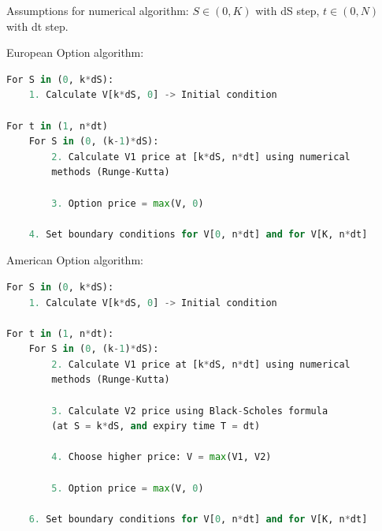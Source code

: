 \documentclass[10pt,a4paper]{article}
\begin{document}
Assumptions for numerical algorithm: $S \in (0, K)$ with dS step, $t \in (0, N)$ with dt step.

European Option algorithm:
\begin{lstlisting}[language=Python]
For S in (0, k*dS):
	1. Calculate V[k*dS, 0] -> Initial condition
	
For t in (1, n*dt)
	For S in (0, (k-1)*dS):
		2. Calculate V1 price at [k*dS, n*dt] using numerical 
		methods (Runge-Kutta)
	
		3. Option price = max(V, 0)
	
	4. Set boundary conditions for V[0, n*dt] and for V[K, n*dt] 
\end{lstlisting}

American Option algorithm:
\begin{lstlisting}[language=Python]
For S in (0, k*dS):
	1. Calculate V[k*dS, 0] -> Initial condition
		
For t in (1, n*dt):
	For S in (0, (k-1)*dS):
		2. Calculate V1 price at [k*dS, n*dt] using numerical 
		methods (Runge-Kutta)
		
		3. Calculate V2 price using Black-Scholes formula 
		(at S = k*dS, and expiry time T = dt)
		
		4. Choose higher price: V = max(V1, V2)
		
		5. Option price = max(V, 0)

	6. Set boundary conditions for V[0, n*dt] and for V[K, n*dt] 
\end{lstlisting}
\end{document}
